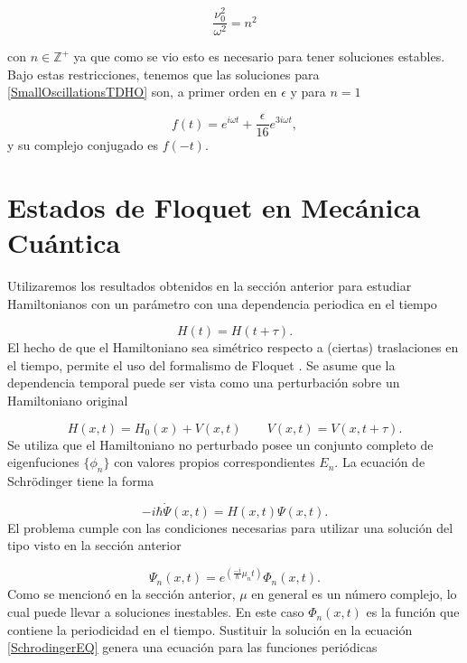\documentclass[10pt,a4paper]{report}
\begin{document}
\begin{equation}
\frac{\nu_0^2}{\omega^2} = n^2\label{scattering}
\end{equation}

con $n \in \mathbb{Z}^+$ ya que como se vio esto es necesario para tener soluciones estables\cite{WardFT}. Bajo estas restricciones, tenemos que las soluciones para \eqref{SmallOscillationsTDHO} son, a primer orden en $\epsilon$ y para $n=1$

\begin{equation}\label{SmallOscillationsSolution}
f(t)=  e^{i\omega t} + \frac{\epsilon}{16} e^{3i\omega t},
\end{equation} y su complejo conjugado es $f(-t)$.


\section{Estados de Floquet en Mecánica Cuántica}

Utilizaremos los resultados obtenidos en la
  sección anterior para estudiar Hamiltonianos con un parámetro con
  una dependencia periodica en el tiempo

\begin{equation} \label{TimeH}
H(t)=H(t+\tau).
\end{equation} El hecho de que el Hamiltoniano sea simétrico respecto a (ciertas) traslaciones en el tiempo, permite el uso del formalismo de Floquet \cite{HanngiDQS}. Se asume que la dependencia temporal puede ser vista como una perturbación sobre un Hamiltoniano original

\begin{equation}
H(x,t)=H_0(x)+V(x,t) \qquad V(x,t)=V(x,t+\tau).
\end{equation}
Se utiliza que el Hamiltoniano no perturbado posee un conjunto
completo de eigenfuciones $\{\phi_n\}$ con valores propios
correspondientes $E_n$.   La
ecuación de Schr\"{o}dinger tiene la forma

\begin{equation}\label{SchrodingerEQ}
-i\hbar\dot{\Psi}(x,t) = H(x,t)\Psi(x,t).
\end{equation} El problema cumple con las condiciones necesarias para utilizar una solución del tipo visto en la sección anterior

\begin{equation}
\Psi_n(x,t) = e^{(\frac{-i}{\hbar}\mu_nt)}\Phi_n(x,t).
\end{equation} Como se mencionó en la sección anterior, $\mu$ en general es un número complejo, lo cual puede llevar a soluciones inestables. En este caso $\Phi_n(x,t)$ es la función que contiene la periodicidad en el tiempo. Sustituir la solución en la ecuación \eqref{SchrodingerEQ} genera una ecuación para las funciones periódicas
\end{document}
